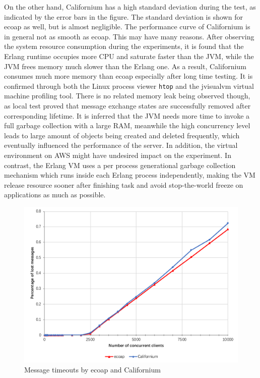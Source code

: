 On the other hand, Californium has a high standard deviation during the test, as indicated by the error bars in the figure. The standard deviation is shown for ecoap as well, but is almost negligible. The performance curve of Californium is in general not as smooth as ecoap.
This may have many reasons. After observing the system resource consumption during the experiments, it is found that the Erlang runtime occupies more CPU and saturate faster than the JVM, while the JVM frees memory much slower than the Erlang one. As a result, Californium consumes much more memory than ecoap especially after long time testing. It is confirmed through both the Linux process viewer \verb|htop| and the jvisualvm \cite{} virtual machine profiling tool. There is no related memory leak being observed though, as local test proved that message exchange states are successfully removed after corresponding lifetime. It is inferred that the JVM needs more time to invoke a full garbage collection with a large RAM, meanwhile the high concurrency level leads to large amount of objects being created and deleted frequently, which eventually influenced the performance of the server. In addition, the virtual environment on AWS might have undesired impact on the experiment. In contrast, the Erlang VM uses a per process generational garbage collection mechanism which runs inside each Erlang process independently, making the VM release resource sooner after finishing task and avoid stop-the-world freeze on applications as much as possible. 

\begin{figure}[!htbp]
\centering
\includegraphics[scale = 0.8]{message_loss_rate}
\caption{Message timeouts by ecoap and Californium}
\label{fig:message_loss_rate}
\end{figure}

